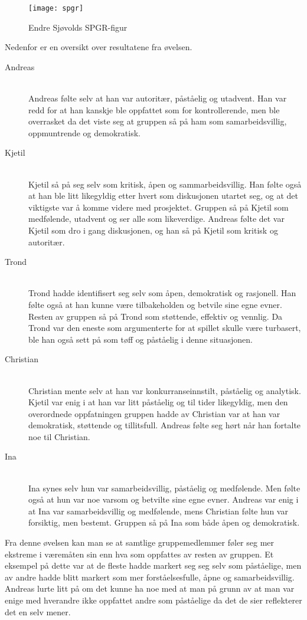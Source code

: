 \begin{figure} [H]
		\begin{center}
			\texttt{[image: spgr]}
		\end{center}
	\caption{Endre Sjøvolds SPGR-figur}
	\label{fig:spgr}
\end{figure}

Nedenfor er en oversikt over resultatene fra øvelsen.
\begin{description}
\item[Andreas] \hfill \\
Andreas følte selv at han var autoritær, påståelig og utadvent. Han var redd for at han kanskje ble oppfattet som for kontrollerende, men ble overrasket da det viste seg at gruppen så på ham som samarbeidsvillig, oppmuntrende og demokratisk. 

\item[Kjetil] \hfill \\
Kjetil så på seg selv som kritisk, åpen og sammarbeidsvillig. Han følte også at han ble litt likegyldig etter hvert som diskusjonen utartet seg, og at det viktigste var å komme videre med prosjektet. Gruppen så på Kjetil som medfølende, utadvent og ser alle som likeverdige. Andreas følte det var Kjetil som dro i gang diskusjonen, og han så på Kjetil som kritisk og autoritær.

\item[Trond] \hfill \\	
Trond hadde identifisert seg selv som åpen, demokratisk og rasjonell. Han følte også at han kunne være tilbakeholden og betvile sine egne evner. Resten av gruppen så på Trond som støttende, effektiv og vennlig. Da Trond var den eneste som argumenterte for at spillet skulle være turbasert, ble han også sett på som tøff og påståelig i denne situasjonen. 

\item[Christian] \hfill \\
Christian mente selv at han var konkurranseinnstilt, påståelig og analytisk. Kjetil var enig i at han var litt påståelig og til tider likegyldig, men den overordnede oppfatningen gruppen hadde av Christian var at han var demokratisk, støttende og tillitsfull. Andreas følte seg hørt når han fortalte noe til Christian.

\item[Ina] \hfill \\
Ina synes selv hun var samarbeidsvillig, påståelig og medfølende. Men følte også at hun var noe varsom og betvilte sine egne evner. Andreas var enig i at Ina var samarbeidsvillig og medfølende, mens Christian følte hun var forsiktig, men bestemt. Gruppen så på Ina som både åpen og demokratisk.  

\end{description}
Fra denne øvelsen kan man se at samtlige gruppemedlemmer føler seg mer
ekstreme i væremåten sin enn hva som oppfattes av resten av gruppen. Et
eksempel på dette var at de fleste hadde markert seg seg selv som
påståelige, men av andre hadde blitt markert som mer forståelsesfulle,
åpne og samarbeidsvillig. Andreas lurte litt på om det kunne ha noe med
at man på grunn av at man var enige med hverandre ikke oppfattet andre
som påståelige da det de sier reflekterer det en selv mener. 

